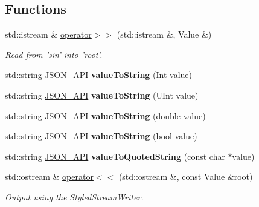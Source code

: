 \subsection*{Functions}
\begin{DoxyCompactItemize}
\item 
std\-::istream \& \hyperlink{namespace_json_a4d245ef719cc0853e8e78eb5f99c16e5}{operator$>$$>$} (std\-::istream \&, Value \&)
\begin{DoxyCompactList}\small\item\em Read from 'sin' into 'root'. \end{DoxyCompactList}\item 
\hypertarget{namespace_json_a5d3eba6789f9a9c1ab563ff8b4a5090f}{std\-::string \hyperlink{protocol_json_1_1_j_s_o_n___a_p_i}{J\-S\-O\-N\-\_\-\-A\-P\-I} {\bfseries value\-To\-String} (Int value)}\label{namespace_json_a5d3eba6789f9a9c1ab563ff8b4a5090f}

\item 
\hypertarget{namespace_json_a4d43b0ff222bd3975bcf1babca0b978f}{std\-::string \hyperlink{protocol_json_1_1_j_s_o_n___a_p_i}{J\-S\-O\-N\-\_\-\-A\-P\-I} {\bfseries value\-To\-String} (U\-Int value)}\label{namespace_json_a4d43b0ff222bd3975bcf1babca0b978f}

\item 
\hypertarget{namespace_json_a99995d7dafa4f4970b349d7d3c8d1d99}{std\-::string \hyperlink{protocol_json_1_1_j_s_o_n___a_p_i}{J\-S\-O\-N\-\_\-\-A\-P\-I} {\bfseries value\-To\-String} (double value)}\label{namespace_json_a99995d7dafa4f4970b349d7d3c8d1d99}

\item 
\hypertarget{namespace_json_a979ed531f091985e22f0051cd2a8e341}{std\-::string \hyperlink{protocol_json_1_1_j_s_o_n___a_p_i}{J\-S\-O\-N\-\_\-\-A\-P\-I} {\bfseries value\-To\-String} (bool value)}\label{namespace_json_a979ed531f091985e22f0051cd2a8e341}

\item 
\hypertarget{namespace_json_aa0c8235a4a5c6599da5d3332743db8ac}{std\-::string \hyperlink{protocol_json_1_1_j_s_o_n___a_p_i}{J\-S\-O\-N\-\_\-\-A\-P\-I} {\bfseries value\-To\-Quoted\-String} (const char $\ast$value)}\label{namespace_json_aa0c8235a4a5c6599da5d3332743db8ac}

\item 
std\-::ostream \& \hyperlink{namespace_json_a87bc83d7e90fc666d28aa16727deda2f}{operator$<$$<$} (std\-::ostream \&, const Value \&root)
\begin{DoxyCompactList}\small\item\em Output using the Styled\-Stream\-Writer. \end{DoxyCompactList}\end{DoxyCompactItemize}


